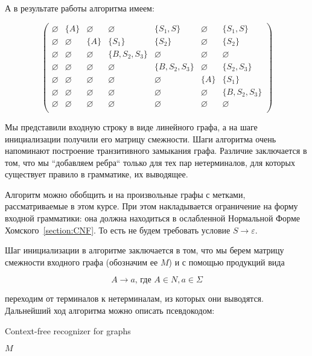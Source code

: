 А в результате работы алгоритма имеем:

\[
\begin{pmatrix}
\varnothing & \{A\}  	  & \varnothing & \varnothing    & \{S_1, S\}	  & \varnothing & \{S_1, S\} 	 \\
\varnothing & \varnothing & \{A\} 	    & \{S_1\}  		 & \{S_2\}  		  & \varnothing & \{S_2\}	 	 \\
\varnothing & \varnothing & \varnothing & \{B, S_2, S_3\} & \varnothing 	  & \varnothing & \varnothing 	 \\
\varnothing & \varnothing & \varnothing & \varnothing    & \{B, S_2, S_3\} & \varnothing & \{S_2, S_3\}	 \\
\varnothing & \varnothing & \varnothing & \varnothing    & \varnothing 	  & \{A\} 	    & \{S_1\}	 		 \\
\varnothing & \varnothing & \varnothing & \varnothing    & \varnothing 	  & \varnothing & \{B, S_2, S_3\} \\
\varnothing & \varnothing & \varnothing & \varnothing    & \varnothing 	  & \varnothing & \varnothing	 \\
\end{pmatrix}
\]

Мы представили входную строку в виде линейного графа, а на шаге инициализации получили его матрицу смежности. Шаги алгоритма очень напоминают построение транзитивного замыкания графа. Различие заключается в том, что мы ``добавляем ребра`` только для тех пар нетерминалов, для которых существует правило в грамматике, их выводящее. 

Алгоритм можно обобщить и на произвольные графы с метками, рассматриваемые в этом курсе. При этом накладывается ограничение на форму входной грамматики: она должна находиться в ослабленной Нормальной Форме Хомского~\ref{section:CNF}. То есть не будем требовать условие $S \to \varepsilon$.

Шаг инициализации в алгоритме заключается в том, что мы берем матрицу смежности входного графа (обозначим ее $M$) и с помощью продукций вида 

\[A \to a \text{, где } A \in N, a \in \Sigma\]

переходим от терминалов к нетерминалам, из которых они выводятся. Дальнейший ход алгоритма можно описать псевдокодом:

\begin{algorithm}[H]
	\begin{algorithmic}[1]
		\caption{Context-free recognizer for graphs}
		\label{alg:graphParse}
		
						\EndIf
					\EndFor 
				\EndFor
			\EndFor 
		\EndFor 
		\State \Return $M$
		\EndFunction
	\end{algorithmic}
\end{algorithm}

